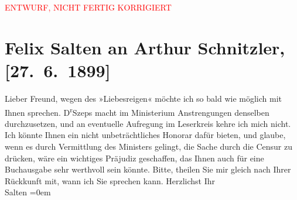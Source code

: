 
\begin{center}
            \textcolor{red}{ENTWURF, NICHT FERTIG KORRIGIERT}
                      \end{center}
            
         
         \renewcommand{\erwaehntePersonen}{Personen: Ernest von Koerber, Julius Szeps}
         \renewcommand{\erwaehnteInstitutionen}{Institutionen: Ministerium für Inneres}
         \renewcommand{\erwaehnteOrte}{Orte: Wien}
         \renewcommand{\erwaehnteWerke}{Werke: Reigen. Zehn Dialoge}
               \section[Felix Salten an Arthur Schnitzler, {[}27. 6. 1899{]}]{ Felix Salten an Arthur Schnitzler, {[}27. 6. 1899{]}}\nopagebreak{}\rehead{ }\begin{ledgroupsized}[t]{13cm}\normalsize\beginnumbering \toendnotes[C]{\smallbreak\pagebreak[2]} 
\toendnotes[C]{\smallbreak}\pstart
           \noindent{}{\pb}Lieber Freund, wegen des »Liebesreigen« möchte ich so bald wie möglich mit Ihnen sprechen. D\textsuperscript{r}Szeps macht im Ministerium Anstrengungen denselben
               durchzusetzen, und an eventuelle Aufregung im Leserkreis kehre ich mich nicht. Ich
               könnte Ihnen ein nicht unbeträchtliches Honorar dafür bieten, und glaube, wenn es
               durch Vermittlung des Ministers gelingt, die Sache durch die Censur zu drücken, wäre ein wichtiges
               Präjudiz geschaffen, das Ihnen auch für eine Buchausgabe sehr werthvoll sein könnte.
               Bitte, theilen Sie mir gleich nach Ihrer Rückkunft mit, wann ich Sie sprechen kann. \pend
           \pstart
           Herzlichst Ihr {\\[\baselineskip]}\spacefill\mbox{Salten}\pend
           \leftskip=0em{}
         
         \endnumbering{}\end{ledgroupsized}\begin{anhang}\end{anhang}\newcommand{\dateiname}{L03294}\newcommand{\titel}{Felix Salten an Arthur Schnitzler, [27. 6. 1899]}\newcommand{\editorInnen}{Martin Anton Müller und Laura Untner}
      
